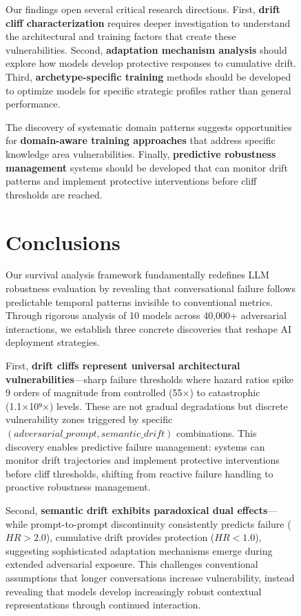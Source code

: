 \documentclass[letterpaper]{article}
\begin{document}
\begin{figure}[ht]
Our findings open several critical research directions. First, \textbf{drift cliff characterization} requires deeper investigation to understand the architectural and training factors that create these vulnerabilities. Second, \textbf{adaptation mechanism analysis} should explore how models develop protective responses to cumulative drift. Third, \textbf{archetype-specific training} methods should be developed to optimize models for specific strategic profiles rather than general performance.

The discovery of systematic domain patterns suggests opportunities for \textbf{domain-aware training approaches} that address specific knowledge area vulnerabilities. Finally, \textbf{predictive robustness management} systems should be developed that can monitor drift patterns and implement protective interventions before cliff thresholds are reached.

\section{Conclusions}

Our survival analysis framework fundamentally redefines LLM robustness evaluation by revealing that conversational failure follows predictable temporal patterns invisible to conventional metrics. Through rigorous analysis of 10 models across 40,000+ adversarial interactions, we establish three concrete discoveries that reshape AI deployment strategies.

First, \textbf{drift cliffs represent universal architectural vulnerabilities}—sharp failure thresholds where hazard ratios spike 9 orders of magnitude from controlled (55×) to catastrophic (1.1×10⁹×) levels. These are not gradual degradations but discrete vulnerability zones triggered by specific $(adversarial\_prompt, semantic\_drift)$ combinations. This discovery enables predictive failure management: systems can monitor drift trajectories and implement protective interventions before cliff thresholds, shifting from reactive failure handling to proactive robustness management.

Second, \textbf{semantic drift exhibits paradoxical dual effects}—while prompt-to-prompt discontinuity consistently predicts failure ($HR > 2.0$), cumulative drift provides protection ($HR < 1.0$), suggesting sophisticated adaptation mechanisms emerge during extended adversarial exposure. This challenges conventional assumptions that longer conversations increase vulnerability, instead revealing that models develop increasingly robust contextual representations through continued interaction.


\end{figure}
\end{document}
